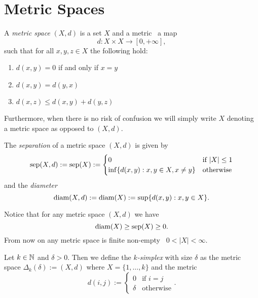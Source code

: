 \section{Metric Spaces}
\begin{definition}{}{}
A \emph{metric space} $(X,d)$ is a set $X$ and a metric \ie\ a map
\begin{equation*}
d: X \times X \to [0, +\infty],
\end{equation*}
such that for all $x,y,z \in X$ the following hold:
\begin{enumerate}
    \item $d(x,y) = 0$ if and only if $x = y$
    \item $d(x,y) = d(y,x)$
    \item $d(x,z) \leq d(x,y) + d(y,z)$
\end{enumerate}
\end{definition}
Furthermore, when there is no risk of confusion we will simply write $X$ denoting a metric space as opposed to $(X,d)$.

\begin{definition}{}{}
The \emph{separation} of a metric space $(X,d)$ is given by
\begin{equation*}
\mathrm{sep}(X,d) := \mathrm{sep}(X) := \begin{cases}
    0 & \text{if } |X| \le 1\\
    \inf\{d(x,y): x,y \in X, x \neq y\} & \text{otherwise}
\end{cases}
\end{equation*}
and the \emph{diameter}
\begin{equation*}
\mathrm{diam}(X,d) := \mathrm{diam}(X) := \sup\{d(x,y): x,y \in X\}.
\end{equation*}
\end{definition}

Notice that for any metric space $(X,d)$ we have
$$
\mathrm{diam}(X) \geq \mathrm{sep}(X) \ge 0.
$$
From now on any metric space is finite non-empty \ie\ $0 < |X| < \infty$.


\begin{definition}{}{}
    Let $k \in \mathbb N$ and $\delta > 0$. Then we define the \emph{$k$-simplex} with size $\delta$ as the metric space $\Delta_k(\delta) := (X,d)$ where $X = \{1, \dots, k\}$ and the metric
    $$
    d(i,j) := \begin{cases}
        0 & \text{if } i = j\\
        \delta & \text{otherwise}
    \end{cases}.
    $$
\end{definition}